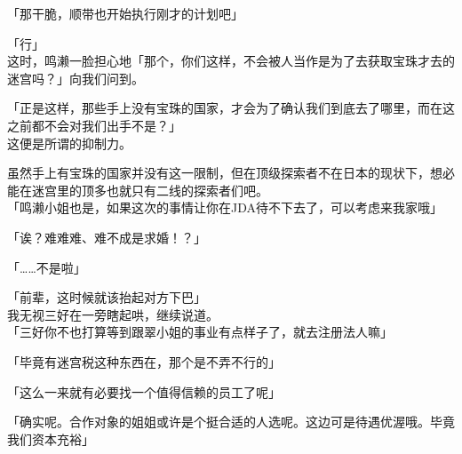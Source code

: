 「那干脆，顺带也开始执行刚才的计划吧」

「行」\\

这时，鸣濑一脸担心地「那个，你们这样，不会被人当作是为了去获取宝珠才去的迷宫吗？」向我们问到。

「正是这样，那些手上没有宝珠的国家，才会为了确认我们到底去了哪里，而在这之前都不会对我们出手不是？」\\

这便是所谓的抑制力。

虽然手上有宝珠的国家并没有这一限制，但在顶级探索者不在日本的现状下，想必能在迷宫里的顶多也就只有二线的探索者们吧。\\

「鸣濑小姐也是，如果这次的事情让你在JDA待不下去了，可以考虑来我家哦」

「诶？难难难、难不成是求婚！？」

「……不是啦」

「前辈，这时候就该抬起对方下巴」\\

我无视三好在一旁瞎起哄，继续说道。\\

「三好你不也打算等到跟翠小姐的事业有点样子了，就去注册法人嘛」

「毕竟有迷宫税这种东西在，那个是不弄不行的」

「这么一来就有必要找一个值得信赖的员工了呢」

「确实呢。合作对象的姐姐或许是个挺合适的人选呢。这边可是待遇优渥哦。毕竟我们资本充裕」

